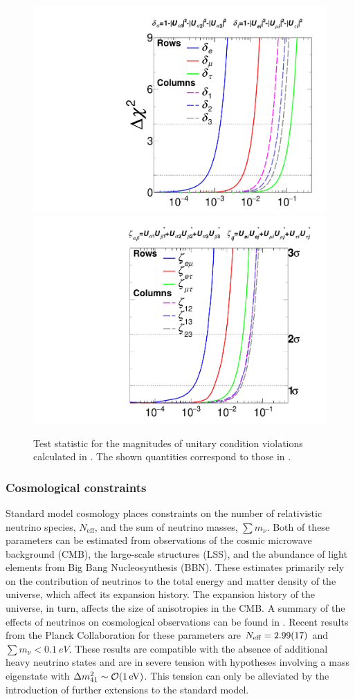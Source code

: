 \begin{figure}
    \centering
    \includegraphics[width=0.49\linewidth]{figures/theory/Norm.pdf}
    \includegraphics[width=0.49\linewidth]{figures/theory/Clos_temp.pdf}
    \caption{Test statistic for the magnitudes of unitary condition violations calculated in \cite{global_unitarity_Hu}. The shown quantities correspond to those in .\label{fig:nonunitary-global-fits}}
\end{figure}

\subsubsection{Cosmological constraints}
Standard model cosmology places constraints on the number of relativistic neutrino species, $N_\mathrm{eff}$, and the sum of neutrino masses, $\sum m_\nu$.
Both of these parameters can be estimated from observations of the cosmic microwave background (CMB), the large-scale structures (LSS), and the abundance of light elements from Big Bang Nucleosynthesis (BBN).
These estimates primarily rely on the contribution of neutrinos to the total energy and matter density of the universe, which affect its expansion history.
The expansion history of the universe, in turn, affects the size of anisotropies in the CMB.
A summary of the effects of neutrinos on cosmological observations can be found in .
Recent results from the Planck Collaboration for these parameters are $N_\mathrm{eff}=\num{2.99+-0.17}$ and $\sum m_\nu < \SI{0.1}{eV}$. These results are compatible with the absence of additional heavy neutrino states and are in severe tension with hypotheses involving a mass eigenstate with $\Delta m^2_{41} \sim \order{\SI{1}{eV}}$.
This tension can only be alleviated by the introduction of further extensions to the standard model.

